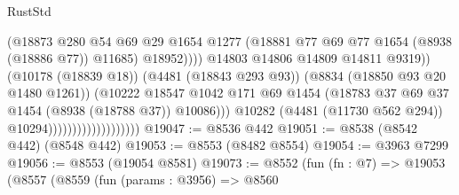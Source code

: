 \begin{lexlean}{RustStd}
\begin{coremodule}
                                                      (@18873
                                                        @280
                                                        @54
                                                        @69
                                                        @29
                                                        @1654
                                                        @1277
                                                        (@18881
                                                          @77
                                                          @69
                                                          @77
                                                          @1654
                                                          (@8938 (@18886 @77))
                                                          @11685)
                                                        @18952))))
                                                @14803
                                                @14806
                                                @14809
                                                @14811
                                                @9319))
                                            (@10178 (@18839 @18))
                                            (@4481 (@18843 @293 @93))
                                            (@8834 (@18850 @93 @20 @1480 @1261))
                                            (@10222
                                              @18547
                                              @1042
                                              @171
                                              @69
                                              @1454
                                              (@18783
                                                @37
                                                @69
                                                @37
                                                @1454
                                                (@8938 (@18788 @37))
                                                @10086)))
                                          @10282
                                          (@4481 (@11730 @562 @294))
                                          @10294)))))))))))))))))))
@19047 := @8536 @442
@19051 := @8538 (@8542 @442) (@8548 @442)
@19053 := @8553 (@8482 @8554)
@19054 := @3963 @7299
@19056 := @8553 (@19054 @8581)
@19073 := @8552
    (fun (fn : @7) =>
    @19053
      (@8557
        (@8559
          (fun (params : @3956) =>
          @8560

\end{coremodule}
\end{lexlean}
